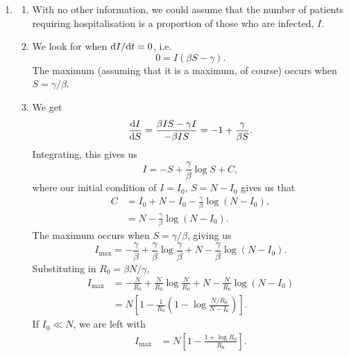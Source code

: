 \documentclass[a4paper,12pt]{article}
\begin{document}
\begin{enumerate}[label={\bf \arabic{*}.\;}, ref={\arabic{*}},itemsep=3ex, left=0ex]
{\begin{enumerate}[label=(\alph*)]
        \item
          \begin{enumerate}[label=(\roman*)]
            \item With no other information, we could assume that the number of patients requiring hospitalisation is a proportion of those who are infected, $I$.
            \item We look for when $\fd{I}{t} = 0$, i.e.\
              \begin{equation}
                0 = I(\beta S - \gamma).
              \end{equation}
              The maximum (assuming that it is a maximum, of course) occurs when $S = \gamma/\beta$.

            \item We get
              \begin{equation}
                \fd{I}{S} = \frac{\beta IS - \gamma I}{-\beta I S} = -1 + \frac{\gamma}{\beta S}.
              \end{equation}
              Integrating, this gives us
              \begin{equation}
                I = -S + \frac{\gamma}{\beta}\log S + C,
              \end{equation}
              where our initial condition of $I=I_0$, $S=N-I_0$ gives us that
              \begin{align}
                C &= I_0 + N - I_0 - \frac{\gamma}{\beta}\log (N-I_0),\\
                &= N - \frac{\gamma}{\beta}\log (N-I_0).
              \end{align}
              The maximum occurs when $S = \gamma/\beta$, giving us
              \begin{equation}
                I_{\text{max}} = - \frac{\gamma}{\beta} + \frac{\gamma}{\beta} \log\frac{\gamma}{\beta} + N - \frac{\gamma}{\beta} \log (N-I_0).
              \end{equation}
              Substituting in $R_0 = \beta N / \gamma$,
              \begin{align}
                I_{\text{max}} &= - \frac{N}{R_0} + \frac{N}{R_0} \log \frac{N}{R_0} + N - \frac{N}{R_0} \log (N-I_0) \\
                &= N\left[1 - \frac{1}{R_0}\left(1-\log \frac{N/R_0}{N-I_0}\right)\right].
              \end{align}
              If $I_0\ll N$, we are left with
              \begin{align}
                I_{\text{max}}&= N\left[1 - \frac{1+\log R_0}{R_0}\right].
              \end{align}
          \end{enumerate}
      \end{enumerate}

}
\end{enumerate}
\end{document}
